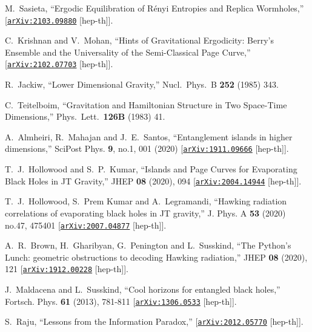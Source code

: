 \documentclass[12pt]{article}
\newcommand \arXiv [1]{\href{http://arxiv.org/abs/#1}{\tt arXiv:#1}}
\begin{document}
\begin{thebibliography}{99}
{%
M.~Sasieta,
``Ergodic Equilibration of R\'enyi Entropies and Replica Wormholes,''
[\arXiv{2103.09880} [hep-th]].

C.~Krishnan and V.~Mohan,
``Hints of Gravitational Ergodicity: Berry's Ensemble and the Universality of the Semi-Classical Page Curve,''
[\arXiv{2102.07703} [hep-th]].

  R.~Jackiw,
  ``Lower Dimensional Gravity,''
  Nucl.\ Phys.\ B {\bf 252} (1985) 343.


  C.~Teitelboim,
  ``Gravitation and Hamiltonian Structure in Two Space-Time Dimensions,''
  Phys.\ Lett.\  {\bf 126B} (1983) 41.

A.~Almheiri, R.~Mahajan and J.~E.~Santos,
``Entanglement islands in higher dimensions,''
SciPost Phys. \textbf{9}, no.1, 001 (2020)
[\arXiv{1911.09666} [hep-th]].


 
 


T.~J.~Hollowood and S.~P.~Kumar,
``Islands and Page Curves for Evaporating Black Holes in JT Gravity,''
JHEP \textbf{08} (2020), 094
[\arXiv{2004.14944} [hep-th]].

T.~J.~Hollowood, S.~Prem Kumar and A.~Legramandi,
``Hawking radiation correlations of evaporating black holes in JT gravity,''
J. Phys. A \textbf{53} (2020) no.47, 475401
[\arXiv{2007.04877} [hep-th]].

 
A.~R.~Brown, H.~Gharibyan, G.~Penington and L.~Susskind,
``The Python\textquoteright{}s Lunch: geometric obstructions to decoding Hawking radiation,''
JHEP \textbf{08} (2020), 121
[\arXiv{1912.00228} [hep-th]].

J.~Maldacena and L.~Susskind,
``Cool horizons for entangled black holes,''
Fortsch. Phys. \textbf{61} (2013), 781-811
[\arXiv{1306.0533} [hep-th]].


S.~Raju,
``Lessons from the Information Paradox,''
[\arXiv{2012.05770} [hep-th]].

}
\end{thebibliography}
\end{document}
